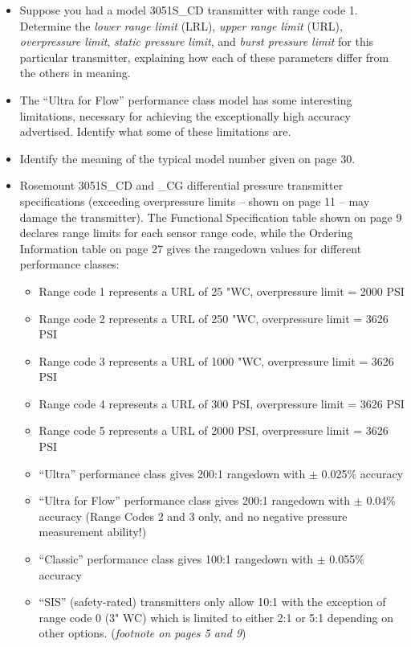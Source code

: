 \begin{itemize}
\item{} Suppose you had a model 3051S\_CD transmitter with range code 1.  Determine the {\it lower range limit} (LRL), {\it upper range limit} (URL), {\it overpressure limit}, {\it static pressure limit}, and {\it burst pressure limit} for this particular transmitter, explaining how each of these parameters differ from the others in meaning.
\item{} The ``Ultra for Flow'' performance class model has some interesting limitations, necessary for achieving the exceptionally high accuracy advertised.  Identify what some of these limitations are.
\item{} Identify the meaning of the typical model number given on page 30.
\end{itemize}














\begin{itemize}
\item{} Rosemount 3051S\_CD and \_CG differential pressure transmitter specifications (exceeding overpressure limits -- shown on page 11 -- may damage the transmitter).  The Functional Specification table shown on page 9 declares range limits for each sensor range code, while the Ordering Information table on page 27 gives the rangedown values for different performance classes:
\begin{itemize}

\item{} Range code 1 represents a URL of 25 "WC, overpressure limit = 2000 PSI
\item{} Range code 2 represents a URL of 250 "WC, overpressure limit = 3626 PSI
\item{} Range code 3 represents a URL of 1000 "WC, overpressure limit = 3626 PSI
\item{} Range code 4 represents a URL of 300 PSI, overpressure limit = 3626 PSI
\item{} Range code 5 represents a URL of 2000 PSI, overpressure limit = 3626 PSI
\item{} ``Ultra'' performance class gives 200:1 rangedown with $\pm$ 0.025\% accuracy
\item{} ``Ultra for Flow'' performance class gives 200:1 rangedown with $\pm$ 0.04\% accuracy (Range Codes 2 and 3 only, and no negative pressure measurement ability!)
\item{} ``Classic'' performance class gives 100:1 rangedown with $\pm$ 0.055\% accuracy
\item{} ``SIS'' (safety-rated) transmitters only allow 10:1 with the exception of range code 0 (3" WC) which is limited to either 2:1 or 5:1 depending on other options.  ({\it footnote on pages 5 and 9})
\end{itemize}
\end{itemize}


